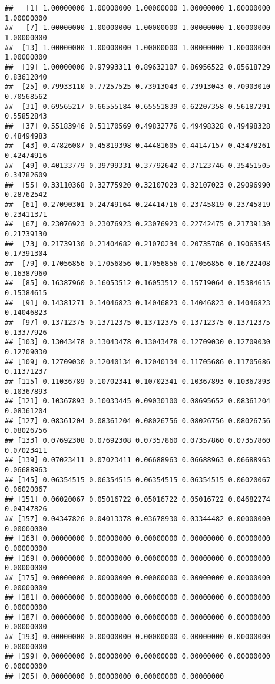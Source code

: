 \documentclass[
]{book}
\newenvironment{Shaded}{\begin{snugshade}}{\end{snugshade}}
\newcommand{\AttributeTok}[1]{\textcolor[rgb]{0.77,0.63,0.00}{#1}}
\newcommand{\CommentTok}[1]{\textcolor[rgb]{0.56,0.35,0.01}{\textit{#1}}}
\newcommand{\ConstantTok}[1]{\textcolor[rgb]{0.00,0.00,0.00}{#1}}
\newcommand{\FunctionTok}[1]{\textcolor[rgb]{0.00,0.00,0.00}{#1}}
\newcommand{\NormalTok}[1]{#1}
\newcommand{\SpecialCharTok}[1]{\textcolor[rgb]{0.00,0.00,0.00}{#1}}
\begin{document}
\begin{Shaded}
\end{Shaded}

\begin{verbatim}
##   [1] 1.00000000 1.00000000 1.00000000 1.00000000 1.00000000 1.00000000
##   [7] 1.00000000 1.00000000 1.00000000 1.00000000 1.00000000 1.00000000
##  [13] 1.00000000 1.00000000 1.00000000 1.00000000 1.00000000 1.00000000
##  [19] 1.00000000 0.97993311 0.89632107 0.86956522 0.85618729 0.83612040
##  [25] 0.79933110 0.77257525 0.73913043 0.73913043 0.70903010 0.70568562
##  [31] 0.69565217 0.66555184 0.65551839 0.62207358 0.56187291 0.55852843
##  [37] 0.55183946 0.51170569 0.49832776 0.49498328 0.49498328 0.48494983
##  [43] 0.47826087 0.45819398 0.44481605 0.44147157 0.43478261 0.42474916
##  [49] 0.40133779 0.39799331 0.37792642 0.37123746 0.35451505 0.34782609
##  [55] 0.33110368 0.32775920 0.32107023 0.32107023 0.29096990 0.28762542
##  [61] 0.27090301 0.24749164 0.24414716 0.23745819 0.23745819 0.23411371
##  [67] 0.23076923 0.23076923 0.23076923 0.22742475 0.21739130 0.21739130
##  [73] 0.21739130 0.21404682 0.21070234 0.20735786 0.19063545 0.17391304
##  [79] 0.17056856 0.17056856 0.17056856 0.17056856 0.16722408 0.16387960
##  [85] 0.16387960 0.16053512 0.16053512 0.15719064 0.15384615 0.15384615
##  [91] 0.14381271 0.14046823 0.14046823 0.14046823 0.14046823 0.14046823
##  [97] 0.13712375 0.13712375 0.13712375 0.13712375 0.13712375 0.13377926
## [103] 0.13043478 0.13043478 0.13043478 0.12709030 0.12709030 0.12709030
## [109] 0.12709030 0.12040134 0.12040134 0.11705686 0.11705686 0.11371237
## [115] 0.11036789 0.10702341 0.10702341 0.10367893 0.10367893 0.10367893
## [121] 0.10367893 0.10033445 0.09030100 0.08695652 0.08361204 0.08361204
## [127] 0.08361204 0.08361204 0.08026756 0.08026756 0.08026756 0.08026756
## [133] 0.07692308 0.07692308 0.07357860 0.07357860 0.07357860 0.07023411
## [139] 0.07023411 0.07023411 0.06688963 0.06688963 0.06688963 0.06688963
## [145] 0.06354515 0.06354515 0.06354515 0.06354515 0.06020067 0.06020067
## [151] 0.06020067 0.05016722 0.05016722 0.05016722 0.04682274 0.04347826
## [157] 0.04347826 0.04013378 0.03678930 0.03344482 0.00000000 0.00000000
## [163] 0.00000000 0.00000000 0.00000000 0.00000000 0.00000000 0.00000000
## [169] 0.00000000 0.00000000 0.00000000 0.00000000 0.00000000 0.00000000
## [175] 0.00000000 0.00000000 0.00000000 0.00000000 0.00000000 0.00000000
## [181] 0.00000000 0.00000000 0.00000000 0.00000000 0.00000000 0.00000000
## [187] 0.00000000 0.00000000 0.00000000 0.00000000 0.00000000 0.00000000
## [193] 0.00000000 0.00000000 0.00000000 0.00000000 0.00000000 0.00000000
## [199] 0.00000000 0.00000000 0.00000000 0.00000000 0.00000000 0.00000000
## [205] 0.00000000 0.00000000 0.00000000 0.00000000
\end{verbatim}
\end{document}
